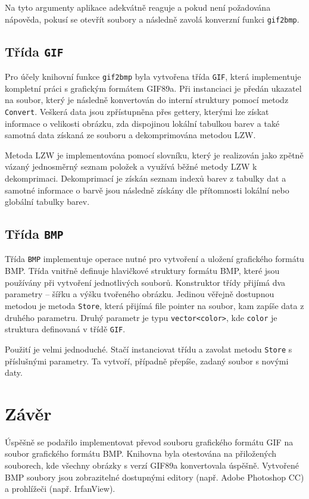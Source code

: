 \documentclass[11pt,a4paper]{article}
\begin{document}
Na tyto argumenty aplikace adekvátně reaguje a pokud není požadována nápověda, pokusí se otevřít soubory a následně zavolá konverzní funkci \texttt{gif2bmp}.

\subsection{Třída \texttt{GIF}}

Pro účely knihovní funkce \texttt{gif2bmp} byla vytvořena třída \texttt{GIF}, která implementuje kompletní práci s grafickým formátem GIF89a. Při instanciaci je předán ukazatel na soubor, který je následně konvertován do interní struktury pomocí metodz \texttt{Convert}. Veškerá data jsou zpřístupněna přes gettery, kterými lze získat informace o velikosti obrázku, zda dispojinou lokální tabulkou barev a také samotná data získaná ze souboru a dekomprimována metodou LZW.

Metoda LZW je implementována pomocí slovníku, který je realizován jako zpětně vázaný jednosměrný seznam položek a využívá běžné metody LZW k dekomprimaci. Dekomprimací je získán seznam indexů barev z tabulky dat a samotné informace o barvě jsou následně získány dle přítomnosti lokální nebo globální tabulky barev.

\subsection{Třída \texttt{BMP}}

Třída \texttt{BMP} implementuje operace nutné pro vytvoření a uložení grafického formátu BMP. Třída vnitřně definuje hlavičkové struktury formátu BMP, které jsou používány při vytvoření jednotlivých souborů. Konstruktor třídy přijímá dva parametry -- šířku a výšku tvořeného obrázku. Jedinou věřejně dostupnou metodou je metoda \texttt{Store}, která přijímá file pointer na soubor, kam zapíše data z druhého parametru. Druhý parametr je typu \texttt{vector<color>}, kde \texttt{color} je struktura definovaná v třídě \texttt{GIF}.

Použití je velmi jednoduché. Stačí instanciovat třídu a zavolat metodu \texttt{Store} s příslušnými parametry. Ta vytvoří, případně přepíše, zadaný soubor s novými daty.


\section{Závěr}

Úspěšně se podařilo implementovat převod souboru grafického formátu GIF na soubor grafického formátu BMP. Knihovna byla otestována na přiložených souborech, kde všechny obrázky s verzí GIF89a konvertovala úspěšně. Vytvořené BMP soubory jsou zobrazitelné dostupnými editory (např. Adobe Photoshop CC) a prohlížeči (např. IrfanView).
\end{document}
